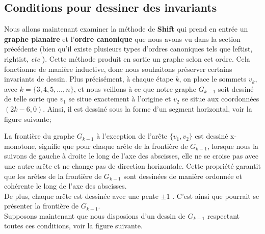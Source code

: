 \documentclass[hidelinks,letterpaper,12pt]{article}
\begin{document}
\subsection{Conditions pour dessiner des invariants}
\label{Condition pour dessiner des invariants}
Nous allons maintenant examiner la méthode de \textbf{Shift} qui prend en entrée un \textbf{graphe planaire} et l'\textbf{ordre canonique} que nous avons vu dans la section précédente (bien qu'il existe plusieurs types d'ordres canoniques tels que leftist, rightist, \textit{etc} \citep{EppsteinGansnerEmden}). Cette méthode produit en sortie un graphe selon cet ordre. Cela fonctionne de manière inductive, donc nous souhaitons préserver certains invariants de dessin. Plus précisément, à chaque étape $k$,  on place le sommets $v_k$, avec \( k = \{3, 4, 5, \dots , n\}\), et nous veillons à ce que notre graphe $G_{k-1}$ soit dessiné de telle sorte que $v_1$ se situe exactement à l'origine et $v_2$ se situe aux coordonnées \((2k-6, 0)\). Ainsi, il est dessiné sous la forme d'un segment horizontal, voir la figure suivante;
\begin{figure}[H]
\centering
{} 
\label{Le graphe $G_{k-1}$ dessiné comme un segement}	
\end{figure}
La frontière du graphe $G_{k-1}$ à l'exception de l'arête \( \{v_1,v_2\} \) est dessiné x-monotone, signifie que pour chaque arête de la frontière de $G_{k-1}$, lorsque nous la suivons de gauche à droite le long de l'axe des abscisses, elle ne se croise pas avec une autre arête et ne change pas de direction horizontale. Cette propriété garantit que les arêtes de la frontière de $G_{k-1}$ sont dessinées de manière ordonnée et cohérente le long de l'axe des abscisses.
\\
De plus, chaque arête est dessinée avec une pente \( \pm 1\) . C'est ainsi que pourrait se présenter la frontière de $G_{k-1}$. 
\\
Supposons maintenant que nous disposions d'un dessin de $G_{k-1}$ respectant toutes ces conditions, voir la figure suivante.
\end{document}
